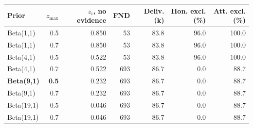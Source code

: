 \begin{tabular}{lrrrrrr}
\toprule
Prior & $z_{\max}$ & $z_i$, no evidence & FND & Deliv. (k) & Hon. excl. (\%) & Att. excl. (\%) \\
\midrule
Beta(1,1) & 0.5 & 0.850 & 53 & 83.8 & 96.0 & 100.0 \\
Beta(1,1) & 0.7 & 0.850 & 53 & 83.8 & 96.0 & 100.0 \\
Beta(4,1) & 0.5 & 0.522 & 53 & 83.8 & 96.0 & 100.0 \\
Beta(4,1) & 0.7 & 0.522 & 693 & 86.7 & 0.0 & 88.7 \\
\textbf{Beta(9,1)} & \textbf{0.5} & 0.232 & 693 & 86.7 & 0.0 & 88.7 \\
Beta(9,1) & 0.7 & 0.232 & 693 & 86.7 & 0.0 & 88.7 \\
Beta(19,1) & 0.5 & 0.046 & 693 & 86.7 & 0.0 & 88.7 \\
Beta(19,1) & 0.7 & 0.046 & 693 & 86.7 & 0.0 & 88.7 \\
\bottomrule
\end{tabular}
